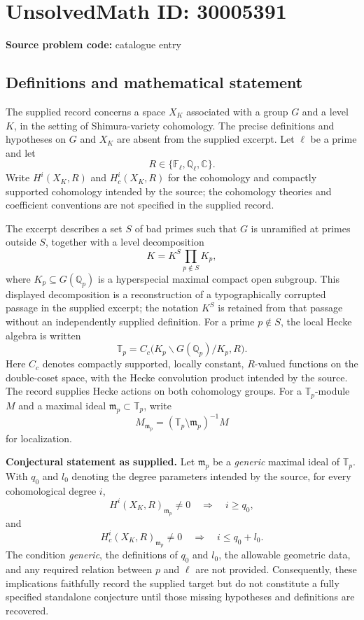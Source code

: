 \documentclass[11pt]{article}
\newcommand{\Q}{\mathbb{Q}}
\newcommand{\C}{\mathbb{C}}
\newcommand{\F}{\mathbb{F}}
\begin{document}
\section*{UnsolvedMath ID: 30005391}
\textbf{Source problem code:} catalogue entry
\subsection{Definitions and mathematical statement}
The supplied record concerns a space \(X_K\) associated with a group \(G\) and a level \(K\), in the setting of Shimura-variety cohomology. The precise definitions and hypotheses on \(G\) and \(X_K\) are absent from the supplied excerpt. Let \(\ell\) be a prime and let
\[
R\in\{\F_\ell,\Q_\ell,\C\}.
\]
Write \(H^i(X_K,R)\) and \(H_c^i(X_K,R)\) for the cohomology and compactly supported cohomology intended by the source; the cohomology theories and coefficient conventions are not specified in the supplied record.

The excerpt describes a set \(S\) of bad primes such that \(G\) is unramified at primes outside \(S\), together with a level decomposition
\[
K=K^S\prod_{p\notin S}K_p,
\]
where \(K_p\subseteq G(\Q_p)\) is a hyperspecial maximal compact open subgroup. This displayed decomposition is a reconstruction of a typographically corrupted passage in the supplied excerpt; the notation \(K^S\) is retained from that passage without an independently supplied definition. For a prime \(p\notin S\), the local Hecke algebra is written
\[
\mathbb T_p=C_c\bigl(K_p\backslash G(\Q_p)/K_p,R\bigr).
\]
Here \(C_c\) denotes compactly supported, locally constant, \(R\)-valued functions on the double-coset space, with the Hecke convolution product intended by the source. The record supplies Hecke actions on both cohomology groups. For a \(\mathbb T_p\)-module \(M\) and a maximal ideal \(\mathfrak m_p\subset\mathbb T_p\), write
\[
M_{\mathfrak m_p}
=(\mathbb T_p\setminus\mathfrak m_p)^{-1}M
\]
for localization.

\textbf{Conjectural statement as supplied.} Let \(\mathfrak m_p\) be a \emph{generic} maximal ideal of \(\mathbb T_p\). With \(q_0\) and \(l_0\) denoting the degree parameters intended by the source, for every cohomological degree \(i\),
\[
H^i(X_K,R)_{\mathfrak m_p}\ne 0
\quad\Longrightarrow\quad i\ge q_0,
\]
and
\[
H_c^i(X_K,R)_{\mathfrak m_p}\ne 0
\quad\Longrightarrow\quad i\le q_0+l_0.
\]
The condition \emph{generic}, the definitions of \(q_0\) and \(l_0\), the allowable geometric data, and any required relation between \(p\) and \(\ell\) are not provided. Consequently, these implications faithfully record the supplied target but do not constitute a fully specified standalone conjecture until those missing hypotheses and definitions are recovered.
\end{document}
